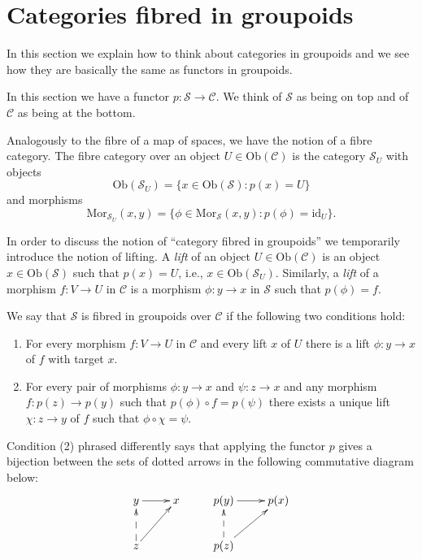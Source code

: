 \section{Categories fibred in groupoids}
\label{section-fibred-groupoids}

\noindent
In this section we explain how to think about categories in groupoids
and we see how they are basically the same as functors in groupoids.

\medskip\noindent
In this section we have a functor $p : \mathcal{S} \to \mathcal{C}$.
We think of $\mathcal{S}$ as being on top and of $\mathcal{C}$ as being
at the bottom.

\medskip\noindent
Analogously to the fibre of a map of spaces, we have the notion of a 
fibre category. The fibre category over an object 
$U\in \text{Ob}(\mathcal{C})$ is the category $\mathcal{S}_U$ with 
objects
$$
\text{Ob}(\mathcal{S}_U) = \{x\in \text{Ob}(\mathcal{S}) :
p(x)=U\}
$$
and morphisms 
$$
\text{Mor}_{\mathcal{S}_U}(x,y) = \{ \phi \in \text{Mor}_\mathcal{S}(x,y) :
p(\phi) = \text{id}_U\}.
$$

\medskip\noindent
In order to discuss the notion of ``category fibred in groupoids'' we
temporarily introduce the notion of lifting.
A {\it lift} of an object $U \in \text{Ob}(\mathcal{C})$ is an object 
$x\in \text{Ob}(\mathcal{S})$ such that $p(x)=U$, i.e., 
$x\in \text{Ob}(\mathcal{S}_U)$.  
Similarly, a {\it lift} of a morphism $f : V \to U$ in $\mathcal{C}$ is a 
morphism $\phi : y \to x$ in $\mathcal{S}$ such that $p(\phi)=f$.

\begin{definition}
\label{definition-fibred-groupoids}
We say that $\mathcal{S}$ is fibred in groupoids over $\mathcal{C}$ if
the following two conditions hold:
\begin{enumerate}
\item For every morphism $f : V \to U$ in $\mathcal{C}$ and every
lift $x$ of $U$ there is a lift $\phi : y \to x$ of $f$ with
target $x$.
\item For every pair of morphisms $ \phi : y \to x$ and $ \psi : z \to x$
and any morphism $ f : p(z) \to p(y)$ such that $ p(\phi) \circ f = 
p(\psi)$ there exists a unique lift $ \chi : z \to y$ of $f$ such that
$\phi \circ \chi = \psi$.
\end{enumerate}
\end{definition}

\noindent
Condition (2) phrased differently says that 
applying the functor $p$ gives a bijection between the sets 
of dotted arrows in the following commutative diagram below:
$$
\xymatrix{
y \ar[r] & x & p(y) \ar[r] & p(x) \\
z \ar@{-->}[u] \ar[ru] & & p(z) \ar@{-->}[u]\ar[ru] & \\
}
$$

